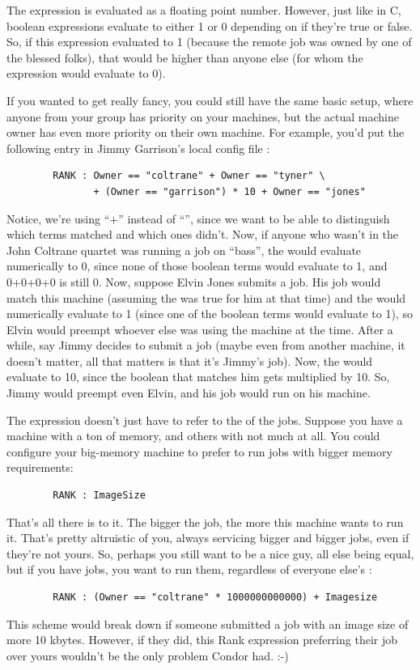 The  expression is evaluated as a floating point number.
However, just like in C, boolean expressions evaluate to either 1 or 0
depending on if they're true or false.  So, if this expression
evaluated to 1 (because the remote job was owned by one of the blessed
folks), that would be higher than anyone else (for whom the expression
would evaluate to 0).

If you wanted to get really fancy, you could still have the same basic
setup, where anyone from your group has priority on your machines, but
the actual machine owner has even more priority on their own machine.
For example, you'd put the following entry in Jimmy Garrison's local
config file :
\begin{verbatim}
        RANK : Owner == "coltrane" + Owner == "tyner" \
               + (Owner == "garrison") * 10 + Owner == "jones"
\end{verbatim}
Notice, we're using ``+'' instead of ``\Bar\Bar'', since we want to be able
to distinguish which terms matched and which ones didn't.  Now, if
anyone who wasn't in the John Coltrane quartet was running a job on
``bass'', the \Expr{RANK} would evaluate numerically to 0, since none
of those boolean terms would evaluate to 1, and 0+0+0+0 is still 0.
Now, suppose Elvin Jones submits a job.  His job would match this
machine (assuming the \Expr{START} was true for him at that time) and
the \Expr{RANK} would numerically evaluate to 1 (since one of the
boolean terms would evaluate to 1), so Elvin would preempt whoever
else was using the machine at the time.  After a while, say Jimmy
decides to submit a job (maybe even from another machine, it doesn't
matter, all that matters is that it's Jimmy's job).  Now, the
 would evaluate to 10, since the boolean that matches him
gets multiplied by 10.  So, Jimmy would preempt even Elvin, and his
job would run on his machine.

The  expression doesn't just have to refer to the
 of the jobs.  Suppose you have a machine with a ton of
memory, and others with not much at all.  You could configure your
big-memory machine to prefer to run jobs with bigger memory
requirements:
\begin{verbatim}
        RANK : ImageSize
\end{verbatim}

That's all there is to it.  The bigger the job, the more this machine
wants to run it.  That's pretty altruistic of you, always servicing
bigger and bigger jobs, even if they're not yours.  So, perhaps you
still want to be a nice guy, all else being equal, but if you have
jobs, you want to run them, regardless of everyone else's
:
\begin{verbatim}
        RANK : (Owner == "coltrane" * 1000000000000) + Imagesize
\end{verbatim}
This scheme would break down if someone submitted a job with an image
size of more 10\Circum12 kbytes.  However, if they did, this Rank expression
preferring their job over yours wouldn't be the only problem Condor
had. :-)


